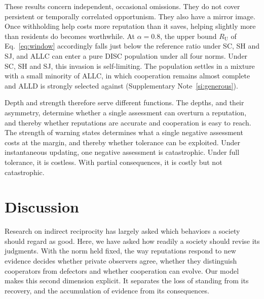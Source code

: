 \documentclass[10pt]{wlscirep}
\newif\ifdraftnotes
\DeclareRobustCommand{\draftnote}[1]{%
  \ifdraftnotes{\color{red!60!black}\sffamily\footnotesize[#1]}\fi}
\theoremstyle{plain}
\theoremstyle{remark}
\begin{document}
These results concern independent, occasional omissions. They do not cover persistent or temporally correlated opportunism. They also have a mirror image. Once withholding help costs more reputation than it saves, helping slightly more than residents do becomes worthwhile. At $\alpha=0.8$, the upper bound $R_{\mathrm U}$ of Eq.~\eqref{eq:window} accordingly falls just below the reference ratio under SC, SH and SJ, and ALLC can enter a pure DISC population under all four norms. Under SC, SH and SJ, this invasion is self-limiting. The population settles in a mixture with a small minority of ALLC, in which cooperation remains almost complete and ALLD is strongly selected against (Supplementary Note~\ref{si:generous}).
\draftnote{Draft: the DISC--ALLC mixtures at $\alpha=0.8$ are a new mean-field calculation of this revision and are not yet part of the verified package.}

Depth and strength therefore serve different functions. The depths, and their asymmetry, determine whether a single assessment can overturn a reputation, and thereby whether reputations are accurate and cooperation is easy to reach. The strength of warning states determines what a single negative assessment costs at the margin, and thereby whether tolerance can be exploited. Under instantaneous updating, one negative assessment is catastrophic. Under full tolerance, it is costless. With partial consequences, it is costly but not catastrophic.

\section*{Discussion}
\draftnote{Discussion revised in revision 3. New: the paragraphs on reputation filters and the open question.}

Research on indirect reciprocity has largely asked which behaviors a society should regard as good\cite{ohtsuki2004,ohtsuki2006,santos2018,kessinger2023}. Here, we have asked how readily a society should revise its judgments. With the norm held fixed, the way reputations respond to new evidence decides whether private observers agree, whether they distinguish cooperators from defectors and whether cooperation can evolve. Our model makes this second dimension explicit. It separates the loss of standing from its recovery, and the accumulation of evidence from its consequences.
\end{document}
